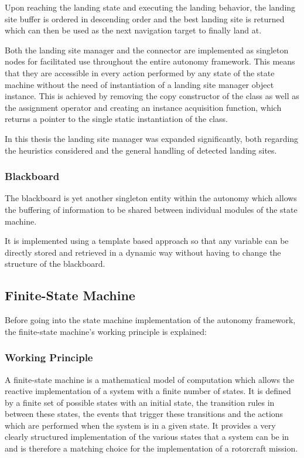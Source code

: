 Upon reaching the landing state and executing the landing behavior, the landing site buffer is ordered in descending order and the best landing site is returned which can then be used as the next navigation target to finally land at.

Both the landing site manager and the connector are implemented as singleton nodes for facilitated use throughout the entire autonomy framework. This means that they are accessible in every action performed by any state of the state machine without the need of instantiation of a landing site manager object instance. This is achieved by removing the copy constructor of the class as well as the assignment operator and creating an instance acquisition function, which returns a pointer to the single static instantiation of the class.

In this thesis the landing site manager was expanded significantly, both regarding the heuristics considered and the general handling of detected landing sites.

\subsubsection{Blackboard}\label{subsubsec:blackboard}

The blackboard is yet another singleton entity within the autonomy which allows the buffering of information to be shared between individual modules of the state machine.

It is implemented using a template based approach so that any variable can be directly stored and retrieved in a dynamic way without having to change the structure of the blackboard.

\subsection{Finite-State Machine}

Before going into the state machine implementation of the autonomy framework, the finite-state machine's working principle is explained:

\subsubsection{Working Principle}

A finite-state machine is a mathematical model of computation which allows the reactive implementation of a system with a finite number of states. It is defined by a finite set of possible states with an initial state, the transition rules in between these states, the events that trigger these transitions and the actions which are performed when the system is in a given state. It provides a very clearly structured implementation of the various states that a system can be in and is therefore a matching choice for the implementation of a rotorcraft mission.

